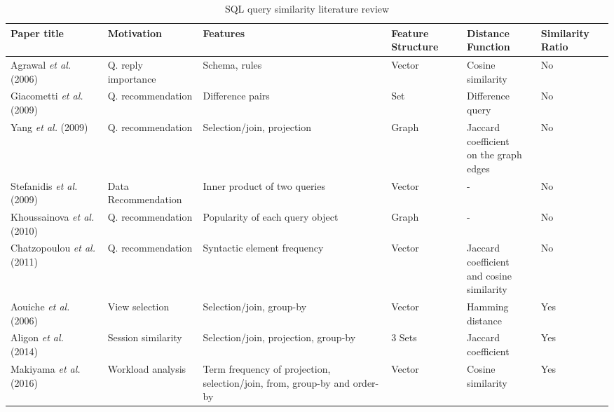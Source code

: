 \begin{table*}[h]
\centering
\begin{tabular}{ C{3.8cm}  C{2.9cm}  C{3.9cm}  C{1.15cm}  C{2.65cm} C{1.35cm}}
\toprule
Paper title & Motivation & Features & Feature Structure & Distance Function & Similarity Ratio \\
\midrule
Agrawal \textit{et al.} (2006)~\cite{agrawal2006context} & Q. reply importance & {\footnotesize Schema, rules} & Vector & Cosine similarity & No \\
Giacometti \textit{et al.} (2009)~\cite{giacometti2009} & Q. recommendation & {\footnotesize Difference pairs} & Set  & Difference query  & No \\[-1mm]
Yang \textit{et al.} (2009)~\cite{yang2009} & Q. recommendation & {\footnotesize Selection/join, projection} & Graph & \parbox{2.6cm}{\footnotesize \center Jaccard coefficient\\[-0.5mm] on the graph edges} & No \\
Stefanidis \textit{et al.} (2009)~\cite{stefanidis2009you} & Data Recommendation & {\footnotesize Inner product of two queries} & Vector & - &  No \\
Khoussainova \textit{et al.} (2010)~\cite{magda2010snipsuggest} & Q. recommendation & {\footnotesize Popularity of each query object} & Graph & -  & No \\[-1mm]
Chatzopoulou \textit{et al.} (2011)~\cite{chatzopoulou2011querie} & Q. recommendation & {\footnotesize Syntactic element frequency} & Vector & \parbox{2.65cm}{\footnotesize \center Jaccard coefficient\\[-0.5mm]and cosine similarity} & No  \\
Aouiche \textit{et al.} (2006)~\cite{aouiche2006} & View selection & {\footnotesize Selection/join, group-by} & Vector & Hamming distance  & Yes \\
Aligon \textit{et al.} (2014)~\cite{aligon2014similarity} & Session similarity & {\footnotesize Selection/join, projection, group-by} & 3 Sets & Jaccard coefficient   & Yes \\
Makiyama \textit{et al.} (2016)~\cite{makiyama2015text} & Workload analysis & {\footnotesize Term frequency of projection, selection/join, from, group-by and order-by} & Vector & Cosine similarity  & Yes \\
\bottomrule
\end{tabular}
\vspace*{-2mm}
\caption{SQL query similarity literature review}
\label{table:literaturereview}
\end{table*}

